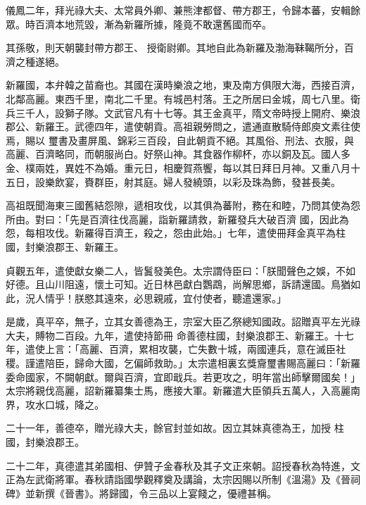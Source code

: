 \begin{pinyinscope}
 儀鳳二年，拜光祿大夫、太常員外卿、兼熊津都督、帶方郡王，令歸本蕃，安輯餘眾。時百濟本地荒毀，漸為新羅所據，隆竟不敢還舊國而卒。



 其孫敬，則天朝襲封帶方郡王、
 授衛尉卿。其地自此為新羅及渤海靺鞨所分，百濟之種遂絕。



 新羅國，本弁韓之苗裔也。其國在漢時樂浪之地，東及南方俱限大海，西接百濟，北鄰高麗。東西千里，南北二千里。有城邑村落。王之所居曰金城，周七八里。衛兵三千人，設獅子隊。文武官凡有十七等。其王金真平，隋文帝時授上開府、樂浪郡公、新羅王。武德四年，遣使朝貢。高祖親勞問之，遣通直散騎侍郎庾文素往使焉，賜以
 璽書及畫屏風、錦彩三百段，自此朝貢不絕。其風俗、刑法、衣服，與高麗、百濟略同，而朝服尚白。好祭山神。其食器作柳杯，亦以銅及瓦。國人多金、樸兩姓，異姓不為婚。重元日，相慶賀燕饗，每以其日拜日月神。又重八月十五日，設樂飲宴，賚群臣，射其庭。婦人發繞頭，以彩及珠為飾，發甚長美。



 高祖既聞海東三國舊結怨隙，遞相攻伐，以其俱為蕃附，務在和睦，乃問其使為怨所由。對曰：「先是百濟往伐高麗，詣新羅請救，新羅發兵大破百濟
 國，因此為怨，每相攻伐。新羅得百濟王，殺之，怨由此始。」七年，遣使冊拜金真平為柱國，封樂浪郡王、新羅王。



 貞觀五年，遣使獻女樂二人，皆鬒發美色。太宗謂侍臣曰：「朕聞聲色之娛，不如好德。且山川阻遠，懷土可知。近日林邑獻白鸚鵡，尚解思鄉，訴請還國。鳥猶如此，況人情乎！朕愍其遠來，必思親戚，宜付使者，聽遣還家。」



 是歲，真平卒，無子，立其女善德為王，宗室大臣乙祭總知國政。詔贈真平左光祿大夫，賻物二百段。九年，遣使持節冊
 命善德柱國，封樂浪郡王、新羅王。十七年，遣使上言：「高麗、百濟，累相攻襲，亡失數十城，兩國連兵，意在滅臣社稷。謹遣陪臣，歸命大國，乞偏師救助。」太宗遣相裏玄獎齎璽書賜高麗曰：「新羅委命國家，不闕朝獻。爾與百濟，宜即戢兵。若更攻之，明年當出師擊爾國矣！」太宗將親伐高麗，詔新羅纂集士馬，應接大軍。新羅遣大臣領兵五萬人，入高麗南界，攻水口城，降之。



 二十一年，善德卒，贈光祿大夫，餘官封並如故。因立其妹真德為王，加授
 柱國，封樂浪郡王。



 二十二年，真德遣其弟國相、伊贊子金春秋及其子文正來朝。詔授春秋為特進，文正為左武衛將軍。春秋請詣國學觀釋奠及講論，太宗因賜以所制《溫湯》及《晉祠碑》並新撰《晉書》。將歸國，令三品以上宴餞之，優禮甚稱。




\end{pinyinscope}
